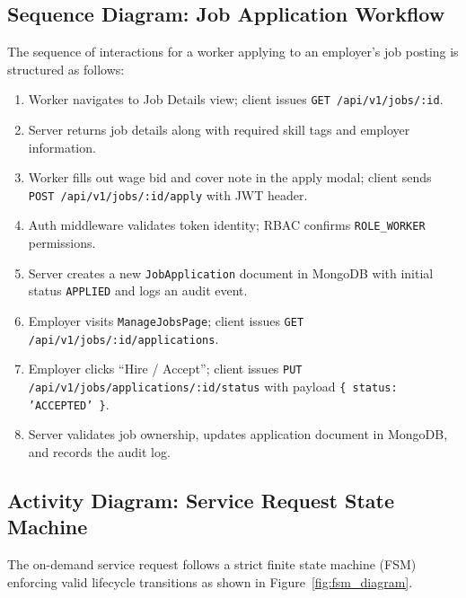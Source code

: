 \subsection{Sequence Diagram: Job Application Workflow}
The sequence of interactions for a worker applying to an employer's job posting is structured as follows:
\begin{enumerate}
    \item Worker navigates to Job Details view; client issues \texttt{GET /api/v1/jobs/:id}.
    \item Server returns job details along with required skill tags and employer information.
    \item Worker fills out wage bid and cover note in the apply modal; client sends \texttt{POST /api/v1/jobs/:id/apply} with JWT header.
    \item Auth middleware validates token identity; RBAC confirms \texttt{ROLE\_WORKER} permissions.
    \item Server creates a new \texttt{JobApplication} document in MongoDB with initial status \texttt{APPLIED} and logs an audit event.
    \item Employer visits \texttt{ManageJobsPage}; client issues \texttt{GET /api/v1/jobs/:id/applications}.
    \item Employer clicks ``Hire / Accept''; client issues \texttt{PUT /api/v1/jobs/applications/:id/status} with payload \texttt{\{ status: 'ACCEPTED' \}}.
    \item Server validates job ownership, updates application document in MongoDB, and records the audit log.
\end{enumerate}

\subsection{Activity Diagram: Service Request State Machine}
The on-demand service request follows a strict finite state machine (FSM) enforcing valid lifecycle transitions as shown in Figure~\ref{fig:fsm_diagram}.


